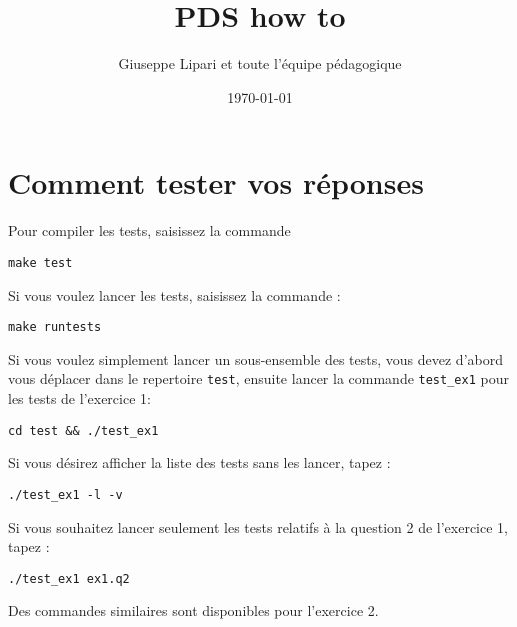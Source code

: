 \documentclass{article}
\author{Giuseppe Lipari et toute l'équipe pédagogique}
\date{\today}
\title{PDS how to}
\begin{document}
\maketitle

\section{Comment tester vos réponses}
\label{sec:org3677453}

Pour compiler les tests, saisissez la commande 

\lstset{language=sh,label= ,caption= ,captionpos=b,numbers=none}
\begin{lstlisting}
make test
\end{lstlisting}

Si vous voulez lancer les tests, saisissez la commande :
\lstset{language=sh,label= ,caption= ,captionpos=b,numbers=none}
\begin{lstlisting}
make runtests
\end{lstlisting}

Si vous voulez simplement lancer un sous-ensemble des tests, vous
devez d'abord vous déplacer dans le repertoire \texttt{test}, ensuite lancer
la commande \texttt{test\_ex1} pour les tests de l'exercice 1:

\lstset{language=sh,label= ,caption= ,captionpos=b,numbers=none}
\begin{lstlisting}
cd test && ./test_ex1
\end{lstlisting}

Si vous désirez afficher la liste des tests sans les lancer, tapez :

\lstset{language=sh,label= ,caption= ,captionpos=b,numbers=none}
\begin{lstlisting}
./test_ex1 -l -v
\end{lstlisting}

Si vous souhaitez lancer seulement les tests relatifs à la question 2
de l'exercice 1, tapez :

\lstset{language=sh,label= ,caption= ,captionpos=b,numbers=none}
\begin{lstlisting}
./test_ex1 ex1.q2 
\end{lstlisting}

Des commandes similaires sont disponibles pour l'exercice 2.
\end{document}
